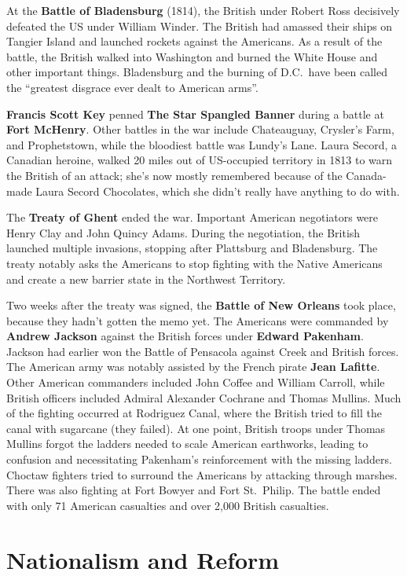 At the \textbf{Battle of Bladensburg} (1814),
the British under Robert Ross decisively defeated the US under William Winder.
The British had amassed their ships on Tangier Island and launched rockets against the Americans.
As a result of the battle, the British walked into Washington and burned the White House and other important things.
Bladensburg and the burning of D.C.\ have been called the ``greatest disgrace ever dealt to American arms''.

\textbf{Francis Scott Key} penned \textbf{The Star Spangled Banner} during a battle at \textbf{Fort McHenry}.
Other battles in the war include Chateauguay, Crysler's Farm, and Prophetstown,
while the bloodiest battle was Lundy's Lane.
Laura Secord, a Canadian heroine,
walked 20 miles out of US-occupied territory in 1813 to warn the British of an attack;
she's now mostly remembered because of the Canada-made Laura Secord Chocolates,
which she didn't really have anything to do with.

The \textbf{Treaty of Ghent} ended the war.
Important American negotiators were Henry Clay and John Quincy Adams.
During the negotiation, the British launched multiple invasions, stopping after Plattsburg and Bladensburg.
The treaty notably asks the Americans to stop fighting with the Native Americans
and create a new barrier state in the Northwest Territory.

Two weeks after the treaty was signed, the \textbf{Battle of New Orleans} took place,
because they hadn't gotten the memo yet.
The Americans were commanded by \textbf{Andrew Jackson} against the British forces under \textbf{Edward Pakenham}.
Jackson had earlier won the Battle of Pensacola against Creek and British forces.
The American army was notably assisted by the French pirate \textbf{Jean Lafitte}.
Other American commanders included John Coffee and William Carroll,
while British officers included Admiral Alexander Cochrane and Thomas Mullins.
Much of the fighting occurred at Rodriguez Canal,
where the British tried to fill the canal with sugarcane (they failed).
At one point, British troops under Thomas Mullins forgot the ladders needed to scale American earthworks,
leading to confusion and necessitating Pakenham's reinforcement with the missing ladders.
Choctaw fighters tried to surround the Americans by attacking through marshes.
There was also fighting at Fort Bowyer and Fort St.\ Philip.
The battle ended with only 71 American casualties and over 2,000 British casualties.

\section{Nationalism and Reform}

